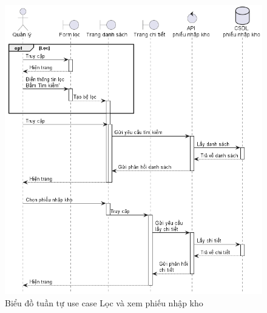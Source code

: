 \documentclass[../DoAn.tex]{subfiles}
\begin{document}
\begin{figure}[H]
    \centering
    \includegraphics[width=1\textwidth]{Hinhve/sequences/ImportReportFilter.png}
    \caption{Biểu đồ tuần tự use case Lọc và xem phiếu nhập kho}
    \label{figure:sd-importreport-filter}
\end{figure}
\break
\end{document}
